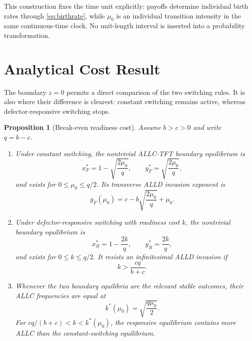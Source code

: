 \documentclass[pdflatex,sn-mathphys-ay]{sn-jnl}
\theoremstyle{thmstyleone}
\newtheorem{proposition}{Proposition}
\begin{document}
This construction fixes the time unit explicitly: payoffs determine individual birth rates through \eqref{eq:birthrate}, while $\mu_0$ is an individual transition intensity in the same continuous-time clock. No unit-length interval is inserted into a probability transformation.

\section{Analytical Cost Result}

The boundary $z=0$ permits a direct comparison of the two switching rules. It is also where their difference is clearest: constant switching remains active, whereas defector-responsive switching stops.

\begin{proposition}[Break-even readiness cost]
Assume $b>c>0$ and write $q=b-c$.
\begin{enumerate}
\item Under constant switching, the nontrivial ALLC-TFT boundary equilibrium is
\begin{equation}
x_F^*=1-\sqrt{\frac{2\mu_0}{q}},\qquad
y_F^*=\sqrt{\frac{2\mu_0}{q}},
\label{eq:fixededge}
\end{equation}
and exists for $0\leq\mu_0\leq q/2$. Its transverse ALLD invasion exponent is
\begin{equation}
g_F(\mu_0)=c-b\sqrt{\frac{2\mu_0}{q}}+\mu_0.
\label{eq:fixedinv}
\end{equation}
\item Under defector-responsive switching with readiness cost $k$, the nontrivial boundary equilibrium is
\begin{equation}
x_R^*=1-\frac{2k}{q},\qquad y_R^*=\frac{2k}{q},
\label{eq:adaptiveedge}
\end{equation}
and exists for $0\leq k\leq q/2$. It resists an infinitesimal ALLD invasion if
\begin{equation}
k>\frac{cq}{b+c}.
\label{eq:adaptiveinv}
\end{equation}
\item Whenever the two boundary equilibria are the relevant stable outcomes, their ALLC frequencies are equal at
\begin{equation}
k^*(\mu_0)=\sqrt{\frac{q\mu_0}{2}}.
\label{eq:threshold}
\end{equation}
For $cq/(b+c)<k<k^*(\mu_0)$, the responsive equilibrium contains more ALLC than the constant-switching equilibrium.
\end{enumerate}
\end{proposition}
\end{document}
